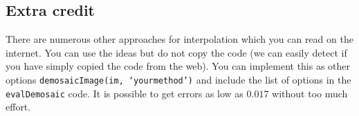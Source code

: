 \documentclass[10pt,letterpaper]{article}
\newcommand{\cmd}[1] {{\color{blue}\texttt{#1}}}
\begin{document}
\subsection{Extra credit}
There are numerous other approaches for interpolation which you can read on the internet. You can use the ideas but do not copy the code (we can easily detect if you have simply copied the code from the web). You can implement this as other options \cmd{demosaicImage(im, `yourmethod')} and include the list of options in the \cmd{evalDemosaic} code. It is possible to get errors as low as $0.017$ without too much effort.
\end{document}
